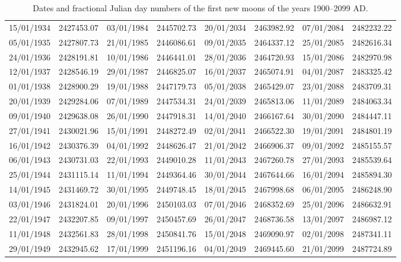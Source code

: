 \begin{table}[!h]
{\begin{tabular}{cc|cc|cc|cc}
15/01/1934 &  2427453.07 &  03/01/1984 &  2445702.73 & 20/01/2034 &  2463982.92 &07/01/2084 & 2482232.22\\
05/01/1935 &  2427807.73 &  21/01/1985 &  2446086.61 & 09/01/2035 &  2464337.12 &25/01/2085 & 2482616.34\\
24/01/1936 &  2428191.81 &  10/01/1986 &  2446441.01 & 28/01/2036 &  2464720.93 &15/01/2086 & 2482970.98\\
12/01/1937 &  2428546.19 &  29/01/1987 &  2446825.07 & 16/01/2037 &  2465074.91 &04/01/2087 & 2483325.42\\
01/01/1938 &  2428900.29 &  19/01/1988 &  2447179.73 & 05/01/2038 &  2465429.07 &23/01/2088 & 2483709.31\\
20/01/1939 &  2429284.06 &  07/01/1989 &  2447534.31 & 24/01/2039 &  2465813.06 &11/01/2089 & 2484063.34\\
09/01/1940 &  2429638.08 &  26/01/1990 &  2447918.31 & 14/01/2040 &  2466167.64 &30/01/2090 & 2484447.11\\
27/01/1941 &  2430021.96 &  15/01/1991 &  2448272.49 & 02/01/2041 &  2466522.30 &19/01/2091 & 2484801.19\\
16/01/1942 &  2430376.39 &  04/01/1992 &  2448626.47 & 21/01/2042 &  2466906.37 &09/01/2092 & 2485155.57\\
06/01/1943 &  2430731.03 &  22/01/1993 &  2449010.28 & 11/01/2043 &  2467260.78 &27/01/2093 & 2485539.64\\
25/01/1944 &  2431115.14 &  11/01/1994 &  2449364.46 & 30/01/2044 &  2467644.66 &16/01/2094 & 2485894.30\\
14/01/1945 &  2431469.72 &  30/01/1995 &  2449748.45 & 18/01/2045 &  2467998.68 &06/01/2095 & 2486248.90\\
03/01/1946 &  2431824.01 &  20/01/1996 &  2450103.03 & 07/01/2046 &  2468352.69 &25/01/2096 & 2486632.91\\
22/01/1947 &  2432207.85 &  09/01/1997 &  2450457.69 & 26/01/2047 &  2468736.58 &13/01/2097 & 2486987.12\\
11/01/1948 &  2432561.83 &  28/01/1998 &  2450841.76 & 15/01/2048 &  2469090.97 &02/01/2098 & 2487341.11\\
29/01/1949 &  2432945.62 &  17/01/1999 &  2451196.16 & 04/01/2049 &  2469445.60 &21/01/2099 & 2487724.89\\
\end{tabular}}
\caption{Dates and fractional Julian day numbers of the first new moons of the years 1900--2099 AD.}\label{tnewmoon}
\end{table}



